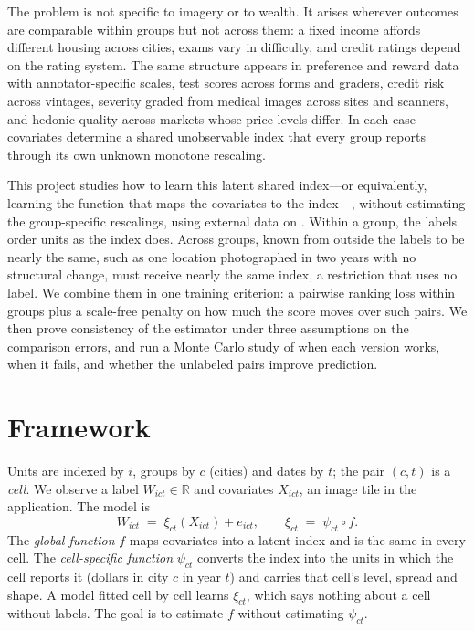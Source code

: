 \documentclass[11pt]{article}
\theoremstyle{tight}
\newcommand{\R}{\mathbb{R}}
\begin{document}
The problem is not specific to imagery or to wealth. It arises wherever outcomes are comparable
within groups but not across them: a fixed income affords different housing across cities, exams
vary in difficulty, and credit ratings depend on the rating system. The same structure appears
in preference and reward data with annotator-specific scales, test scores across forms and
graders, credit risk across vintages, severity graded from medical images across sites and
scanners, and hedonic quality across markets whose price levels differ. In each case covariates
determine a shared unobservable index that every group reports through its own unknown monotone rescaling.

This project studies how to learn this latent shared index---or equivalently, learning the function 
that maps the covariates to the index---, without estimating the group-specific rescalings, using external data
on . Within a group, 
the labels order units as the index does. Across
groups,  known from outside the labels to be nearly the same, such as one location
photographed in two years with no structural change, must receive nearly the same index, a
restriction that uses no label. We combine them in one training criterion: a pairwise ranking
loss within groups plus a scale-free penalty on how much the score moves over such pairs. We
then prove consistency of the estimator under three assumptions on the comparison errors, and
run a Monte Carlo study of when each version works, when it fails, and whether the unlabeled
pairs improve prediction.

\section{Framework}

Units are indexed by $i$, groups by $c$ (cities) and dates by $t$; the pair $(c,t)$ is a
\emph{cell}. We observe a label $W_{ict}\in\R$ and covariates $X_{ict}$, an image tile in the
application. The model is
\begin{equation}\label{eq:model}
  W_{ict} \;=\; \xi_{ct}(X_{ict}) + e_{ict},
  \qquad
  \xi_{ct} \;=\; \psi_{ct}\circ f .
\end{equation}
The \emph{global function} $f$ maps covariates into a latent index and is the same in every
cell. The \emph{cell-specific function} $\psi_{ct}$ converts the index into the units in which
the cell reports it (dollars in city $c$ in year $t$) and carries that cell's level, spread and
shape. A model fitted cell by cell learns $\xi_{ct}$, which says nothing about a cell without
labels. The goal is to estimate $f$ without estimating $\psi_{ct}$.
\end{document}
